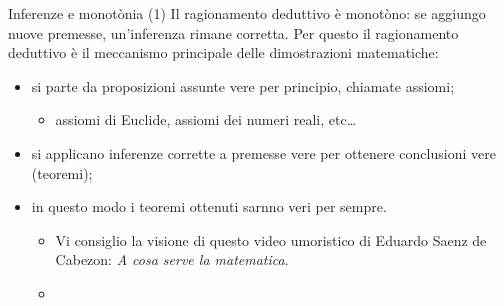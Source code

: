 \documentclass[aspectratio=169,10pt,dvipsnames,handout]{beamer}
\begin{document}




\begin{frame}{Inferenze e monotònia (1)}
	Il ragionamento deduttivo \alert{è monotòno}: se aggiungo nuove premesse, un'inferenza rimane corretta. Per questo il ragionamento deduttivo è il meccanismo principale delle \alert{dimostrazioni matematiche}:
	\begin{itemize}
		\item si parte da proposizioni assunte vere per principio, chiamate \alert{assiomi};
		      \begin{itemize}
			      \item assiomi di Euclide, assiomi dei numeri reali, etc\ldots
		      \end{itemize}
		\item si applicano inferenze corrette a premesse vere per ottenere conclusioni vere (\alert{teoremi});
		\item in questo modo i teoremi ottenuti sarnno veri per sempre.
		\begin{itemize}
			\item Vi consiglio la visione di questo video umoristico di Eduardo Saenz de Cabezon: \emph{A cosa serve la matematica}.
			\item {}
		\end{itemize}
	\end{itemize}
\end{frame}
\end{document}
